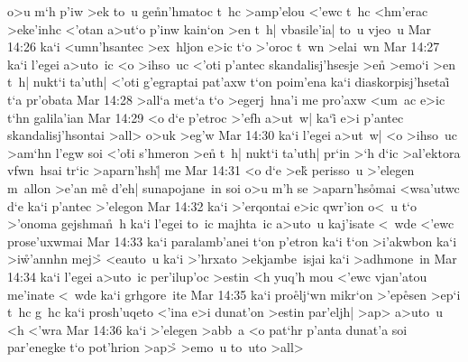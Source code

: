 o>u
m`h
p'iw
>ek
to~u
ge\r{n}n'hmatoc
t~hc
>amp'elou
<'ewc
t~hc
<hm'erac
>eke'inhc
<'otan
a>ut`o
p'inw
kain`on
>en
t~h|
vbasile'ia|
to~u
vjeo~u\bibvsend
\vs Mar 14:26
ka`i
<umn'hsantec
>ex~hljon
e>ic
t`o
>'oroc
t~wn
>elai~wn\bibvsend
\vs Mar 14:27
ka`i
l'egei
a>uto~ic
<o
>ihso~uc
<'oti
p'antec
skandalisj'hsesje
>en\r{}
>emo`i
>en
t~h|
nukt`i
ta'uth|
<'oti
g'egraptai
pat'axw
t`on
poim'ena
ka`i
diaskorpisj'hsetai\r{}
t`a
pr'obata\bibvsend
\vs Mar 14:28
>all`a
met`a
t`o
>egerj~hna'i
me
pro'axw
<um~ac
e>ic
t`hn
galila'ian\bibvsend
\vs Mar 14:29
<o
d`e
p'etroc
>'efh
a>ut~w|
ka`i\r{}
e>i
p'antec
skandalisj'hsontai
>all>
o>uk
>eg'w\bibvsend
\vs Mar 14:30
ka`i
l'egei
a>ut~w|
<o
>ihso~uc
>am`hn
l'egw
soi
<'o\r{t}i
s'hmeron
>en\r{}
t~h|
nukt`i
ta'uth|
pr`in
>`h
d`ic
>al'ektora
vfwn~hsai
tr`ic
>aparn'hsh|\r{}
me\bibvsend
\vs Mar 14:31
<o
d`e
>ek\r{}
perisso~u
>'elegen
m~allon
>e'an
me\r{}
d'eh|
sunapojane~in
soi
o>u
m'h
se
>aparn'hs\r{o}mai
<wsa'utwc
d`e
ka`i
p'antec
>'elegon\bibvsend
\vs Mar 14:32
ka`i
>'erqontai
e>ic
qwr'ion
o<~u
t`o
>'onoma
gejshma\r{n}~h
ka`i
l'egei
to~ic
majhta~ic
a>uto~u
kaj'isate
<~wde
<'ewc
prose'uxwmai\bibvsend
\vs Mar 14:33
ka`i
paralamb'anei
t`on
p'etron
ka`i
\r{t}`on
>i'akwbon
ka`i
>i\r{w}'annhn
mej>\r{}
<eauto~u
ka`i
>'hrxato
>ekjambe~isjai
ka`i
>adhmone~in\bibvsend
\vs Mar 14:34
ka`i
l'egei
a>uto~ic
per'ilup'oc
>estin
<h
yuq'h
mou
<'ewc
vjan'atou
me'inate
<~wde
ka`i
grhgore~ite\bibvsend
\vs Mar 14:35
ka`i
pro\r{e}lj`wn
mikr`on
>'ep\r{e}sen
>ep`i
t~hc
g~hc
ka`i
prosh'uqeto
<'ina
e>i
dunat'on
>estin
par'eljh|
>ap>
a>uto~u
<h
<'wra\bibvsend
\vs Mar 14:36
ka`i
>'elegen
>abb~a
<o
pat`hr
p'anta
dunat'a
soi
par'enegke
t`o
pot'hrion
>ap>\r{}
>emo~u
to~uto
>all>
